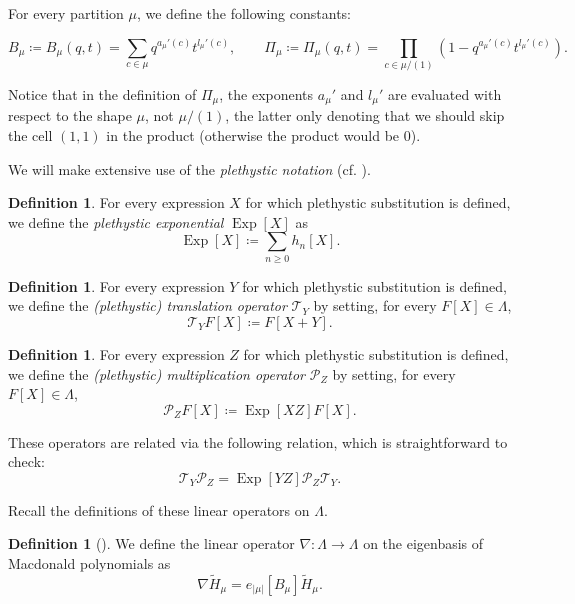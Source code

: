 \documentclass[reqno]{amsart}
\theoremstyle{plain}
\theoremstyle{definition}
\newtheorem{definition}[theorem]{Definition}
\theoremstyle{remark}
\DeclareMathOperator{\Exp}{Exp}
\newcommand{\Ht}{\widetilde{H}}
\newcommand{\<}{\langle}
\renewcommand{\>}{\rangle}
\begin{document}
For every partition $\mu$, we define the following constants:

\[ B_{\mu} \coloneqq B_{\mu}(q,t) = \sum_{c \in \mu} q^{a_{\mu}'(c)} t^{l_{\mu}'(c)}, \qquad
    \Pi_{\mu} \coloneqq \Pi_{\mu}(q,t) = \prod_{c \in \mu / (1)} (1-q^{a_{\mu}'(c)} t^{l_{\mu}'(c)}). \]

Notice that in the definition of $\Pi_\mu$, the exponents $a_{\mu}'$ and $l_{\mu}'$ are evaluated with respect to the shape $\mu$, not $\mu / (1)$, the latter only denoting that we should skip the cell $(1,1)$ in the product (otherwise the product would be $0$).

We will make extensive use of the \emph{plethystic notation} (cf. \cite[Chapter~1]{Haglund2008Book}).

\begin{definition}
    For every expression $X$ for which plethystic substitution is defined, we define the \emph{plethystic exponential} $\Exp[X]$  as
    \[\Exp[X] \coloneqq \sum_{n\geq 0} h_n[X].\]
\end{definition}

\begin{definition}
    For every expression $Y$ for which plethystic substitution is defined, we define the \emph{(plethystic) translation operator} $\mathcal{T}_Y$ by setting, for every $F[X] \in \Lambda$,
    \[ \mathcal{T}_Y F[X] \coloneqq F[X+Y]. \]
\end{definition}

\begin{definition}
    For every expression $Z$ for which plethystic substitution is defined, we define the \emph{(plethystic) multiplication operator} $\mathcal{P}_Z$ by setting, for every $F[X]\in \Lambda$,
    \[ \mathcal{P}_Z F[X] \coloneqq \Exp[XZ] F[X]. \]
\end{definition}

These operators are related via the following relation, which is straightforward to check:
\begin{equation}
    \label{eq:TPExp}
    \mathcal{T}_Y \mathcal{P}_Z= \Exp[YZ] \mathcal{P}_Z \mathcal{T}_Y.
\end{equation}

Recall the definitions of these linear operators on $\Lambda$.

\begin{definition}[{\cite[Equation~(3.11)]{BergeronGarsia1999ScienceFiction}}]
    \label{def:nabla}
    We define the linear operator $\nabla \colon \Lambda \rightarrow \Lambda$ on the eigenbasis of Macdonald polynomials as \[ \nabla \Ht_\mu = e_{\lvert \mu \rvert}[B_\mu] \Ht_\mu. \]
\end{definition}
\end{document}
